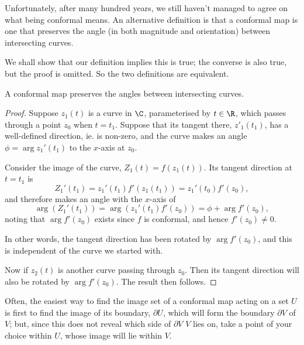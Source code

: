 \documentclass[a4paper]{article}
\begin{document}
Unfortunately, after many hundred years, we still haven't managed to agree on what being conformal means. An alternative definition is that a conformal map is one that preserves the angle (in both magnitude and orientation) between intersecting curves.

We shall show that our definition implies this is true; the converse is also true, but the proof is omitted. So the two definitions are equivalent.

\begin{prop}
  A conformal map preserves the angles between intersecting curves.
\end{prop}

\begin{proof}
  Suppose $z_1(t)$ is a curve in $\C$, parameterised by $t \in \R$, which passes through a point $z_0$ when $t = t_1$. Suppose that its tangent there, $z'_1(t_1)$, has a well-defined direction, ie. is non-zero, and the curve makes an angle $\phi = \arg z_1'(t_1)$ to the $x$-axis at $z_0$.

  Consider the image of the curve, $Z_1(t) = f(z_1(t))$. Its tangent direction at $t = t_1$ is
  \[
    Z_1'(t_1) = z_1'(t_1) f'(z_1(t_1)) = z_1'(t_0) f'(z_0),
  \]
  and therefore makes an angle with the $x$-axis of
  \[
    \arg (Z_1'(t_1)) = \arg(z_1'(t_1) f'(z_0)) = \phi + \arg f'(z_0),
  \]
  noting that $\arg f'(z_0)$ exists since $f$ is conformal, and hence $f'(z_0) \not= 0$.

  In other words, the tangent direction has been rotated by $\arg f'(z_0)$, and this is independent of the curve we started with.

  Now if $z_2(t)$ is another curve passing through $z_0$. Then its tangent direction will also be rotated by $\arg f'(z_0)$. The result then follows.
\end{proof}

Often, the easiest way to find the image set of a conformal map acting on a set $U$ is first to find the image of its boundary, $\partial U$, which will form the boundary $\partial V$ of $V$; but, since this does not reveal which side of $\partial V$ $V$ lies on, take a point of your choice within $U$, whose image will lie within $V$.
\end{document}
